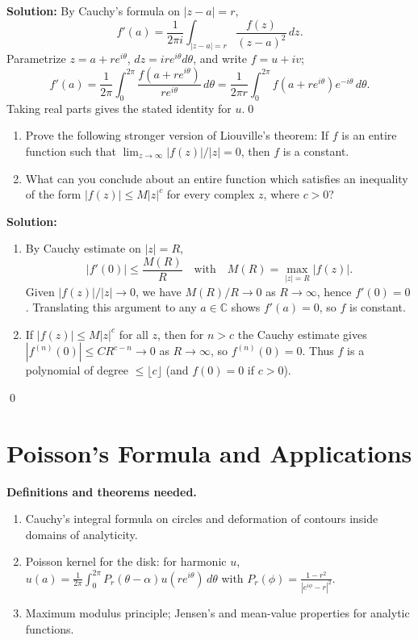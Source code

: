 \bigskip\noindent\textbf{Solution:}
By Cauchy's formula on $|z-a|=r$,
\[f'(a)=\frac{1}{2\pi i}\int_{|z-a|=r} \frac{f(z)}{(z-a)^2}\,dz.\]
Parametrize $z=a+re^{i\theta}$, $dz=ire^{i\theta}d\theta$, and write $f=u+iv$;
\[f'(a)=\frac{1}{2\pi}\int_0^{2\pi} \frac{f(a+re^{i\theta})}{re^{i\theta}}\,d\theta=\frac{1}{2\pi r}\int_0^{2\pi} f(a+re^{i\theta})e^{-i\theta}\,d\theta.\]
Taking real parts gives the stated identity for $u$.\qed


\begin{problembox}
\begin{enumerate}[label=(\alph*)]
\item Prove the following stronger version of Liouville's theorem: If \( f \) is an entire function such that \( \lim_{z \to \infty} |f(z)|/|z| = 0 \), then \( f \) is a constant.
\item What can you conclude about an entire function which satisfies an inequality of the form \( |f(z)| \leq M|z|^c \) for every complex \( z \), where \( c > 0 \)?
\end{enumerate}
\end{problembox}

\bigskip\noindent\textbf{Solution:}
\begin{enumerate}[label=(\alph*)]
\item By Cauchy estimate on $|z|=R$,
\[|f'(0)|\le \frac{M(R)}{R} \quad\text{with}\quad M(R)=\max_{|z|=R}|f(z)|.\]
Given $|f(z)|/|z|\to0$, we have $M(R)/R\to0$ as $R\to\infty$, hence $f'(0)=0$. Translating this argument to any $a\in\mathbb C$ shows $f'(a)=0$, so $f$ is constant.
\item If $|f(z)|\le M|z|^c$ for all $z$, then for $n>c$ the Cauchy estimate gives $|f^{(n)}(0)|\le C R^{c-n}\to0$ as $R\to\infty$, so $f^{(n)}(0)=0$. Thus $f$ is a polynomial of degree $\le \lfloor c\rfloor$ (and $f(0)=0$ if $c>0$).
\end{enumerate}\qed
\section{Poisson's Formula and Applications}

\noindent\textbf{Definitions and theorems needed.}
\begin{enumerate}[label=(\alph*)]
\item Cauchy's integral formula on circles and deformation of contours inside domains of analyticity.
\item Poisson kernel for the disk: for harmonic $u$, $u(a)=\frac{1}{2\pi}\int_0^{2\pi} P_r(\theta-\alpha)u(re^{i\theta})\,d\theta$ with $P_r(\phi)=\frac{1-r^2}{|e^{i\phi}-r|^2}$.
\item Maximum modulus principle; Jensen's and mean-value properties for analytic functions.
\end{enumerate}



